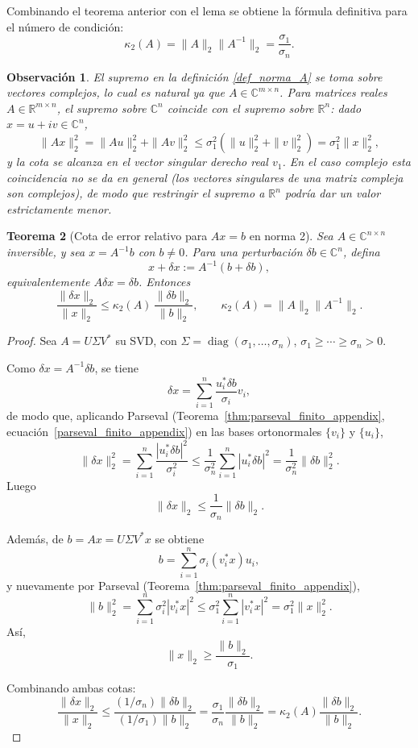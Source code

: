 \documentclass[a4paper,11pt]{report}
\newtheorem{theorem}{Teorema}[chapter]
\newtheorem{remark}[theorem]{Observación}
\begin{document}
Combinando el teorema anterior con el lema se obtiene la fórmula definitiva para el número de condición:
\[
\kappa_2(A) = \|A\|_2\|A^{-1}\|_2 = \frac{\sigma_1}{\sigma_n}.
\]

\begin{remark}
El supremo en la definición \ref{def_norma_A} se toma sobre vectores \emph{complejos}, lo cual es natural ya que $A\in\mathbb{C}^{m\times n}$. Para matrices \emph{reales} $A\in\mathbb{R}^{m\times n}$, el supremo sobre $\mathbb{C}^n$ coincide con el supremo sobre $\mathbb{R}^n$: dado $x=u+iv\in\mathbb{C}^n$,
\[
\|Ax\|_2^2=\|Au\|_2^2+\|Av\|_2^2
\le \sigma_1^2(\|u\|_2^2+\|v\|_2^2)=\sigma_1^2\|x\|_2^2,
\]
y la cota se alcanza en el vector singular derecho real $v_1$. En el caso complejo esta coincidencia no se da en general (los vectores singulares de una matriz compleja son complejos), de modo que restringir el supremo a $\mathbb{R}^n$ podría dar un valor estrictamente menor.
\end{remark}

\begin{theorem}[Cota de error relativo para $Ax=b$ en norma 2]
Sea $A\in\mathbb{C}^{n\times n}$ inversible, y sea $x=A^{-1}b$ con $b\neq 0$. Para una perturbación $\delta b\in\mathbb{C}^n$, defina
\[
x+\delta x:=A^{-1}(b+\delta b),
\]
equivalentemente $A\delta x=\delta b$. Entonces
\[
\frac{\|\delta x\|_2}{\|x\|_2}
\le
\kappa_2(A)\,\frac{\|\delta b\|_2}{\|b\|_2},
\qquad
\kappa_2(A)=\|A\|_2\|A^{-1}\|_2.
\]
\end{theorem}

\begin{proof}
Sea $A=U\Sigma V^*$ su SVD, con $\Sigma=\operatorname{diag}(\sigma_1,\dots,\sigma_n)$, $\sigma_1\ge\cdots\ge\sigma_n>0$.

Como $\delta x=A^{-1}\delta b$, se tiene
\[
\delta x=\sum_{i=1}^n \frac{u_i^*\delta b}{\sigma_i}v_i,
\]
de modo que, aplicando Parseval (Teorema~\ref{thm:parseval_finito_appendix}, ecuación~\eqref{parseval_finito_appendix}) en las bases ortonormales $\{v_i\}$ y $\{u_i\}$,
\[
\|\delta x\|_2^2
=\sum_{i=1}^n\frac{|u_i^*\delta b|^2}{\sigma_i^2}
\le \frac{1}{\sigma_n^2}\sum_{i=1}^n|u_i^*\delta b|^2
=\frac{1}{\sigma_n^2}\|\delta b\|_2^2.
\]
Luego
\[
\|\delta x\|_2\le \frac{1}{\sigma_n}\|\delta b\|_2.
\]

Además, de $b=Ax=U\Sigma V^*x$ se obtiene
\[
b=\sum_{i=1}^n \sigma_i(v_i^*x)u_i,
\]
y nuevamente por Parseval (Teorema~\ref{thm:parseval_finito_appendix}),
\[
\|b\|_2^2
=\sum_{i=1}^n\sigma_i^2|v_i^*x|^2
\le \sigma_1^2\sum_{i=1}^n|v_i^*x|^2
=\sigma_1^2\|x\|_2^2.
\]
Así,
\[
\|x\|_2\ge \frac{\|b\|_2}{\sigma_1}.
\]

Combinando ambas cotas:
\[
\frac{\|\delta x\|_2}{\|x\|_2}
\le
\frac{(1/\sigma_n)\|\delta b\|_2}{(1/\sigma_1)\|b\|_2}
=\frac{\sigma_1}{\sigma_n}\frac{\|\delta b\|_2}{\|b\|_2}
=\kappa_2(A)\frac{\|\delta b\|_2}{\|b\|_2}.
\]
\end{proof}
\end{document}
